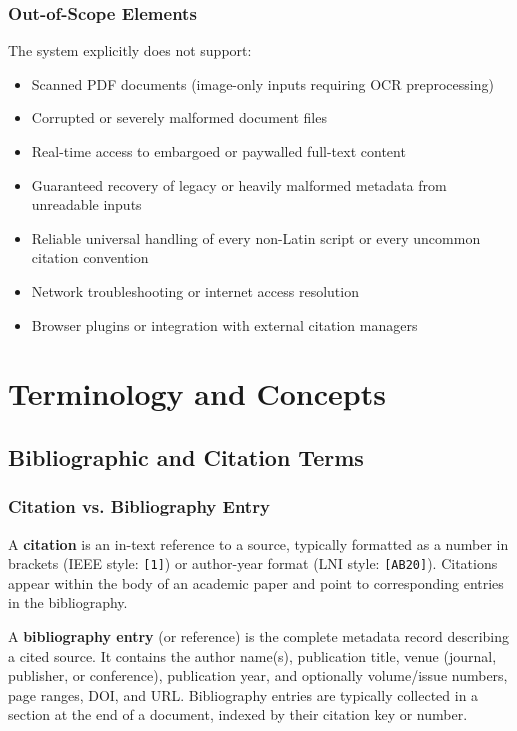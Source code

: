 \documentclass[12pt,a4paper,oneside]{report}
\begin{document}
\subsection{Out-of-Scope Elements}

The system explicitly does not support:
\begin{itemize}
    \item Scanned PDF documents (image-only inputs requiring OCR preprocessing)
    \item Corrupted or severely malformed document files
    \item Real-time access to embargoed or paywalled full-text content
    \item Guaranteed recovery of legacy or heavily malformed metadata from unreadable inputs
    \item Reliable universal handling of every non-Latin script or every uncommon citation convention
    \item Network troubleshooting or internet access resolution
    \item Browser plugins or integration with external citation managers
\end{itemize}

\chapter{Terminology and Concepts}

\section{Bibliographic and Citation Terms}

\subsection{Citation vs. Bibliography Entry}

A \textbf{citation} is an in-text reference to a source, typically formatted as a number in brackets (IEEE style: \texttt{[1]}) or author-year format (LNI style: \texttt{[AB20]}). Citations appear within the body of an academic paper and point to corresponding entries in the bibliography.

A \textbf{bibliography entry} (or reference) is the complete metadata record describing a cited source. It contains the author name(s), publication title, venue (journal, publisher, or conference), publication year, and optionally volume/issue numbers, page ranges, DOI, and URL. Bibliography entries are typically collected in a section at the end of a document, indexed by their citation key or number.
\end{document}
